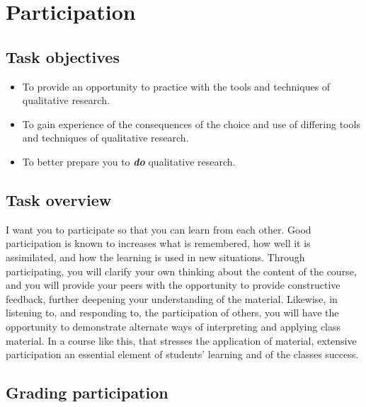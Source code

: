 \documentclass[]{book}
\theoremstyle{definition}
\theoremstyle{definition}
\theoremstyle{definition}
\theoremstyle{remark}
\begin{document}
\hypertarget{ass4}{%
\section{Participation}\label{ass4}}

\hypertarget{task-objectives-3}{%
\subsection*{Task objectives}\label{task-objectives-3}}

\begin{itemize}
\item
  To provide an opportunity to practice with the tools and techniques of
  qualitative research.
\item
  To gain experience of the consequences of the choice and use of
  differing tools and techniques of qualitative research.
\item
  To better prepare you to \textbf{\emph{do}} qualitative research.
\end{itemize}

\hypertarget{task-overview-3}{%
\subsection*{Task overview}\label{task-overview-3}}

I want you to participate so that you can learn from each other. Good
participation is known to increases what is remembered, how well it is
assimilated, and how the learning is used in new situations. Through
participating, you will clarify your own thinking about the content of
the course, and you will provide your peers with the opportunity to
provide constructive feedback, further deepening your understanding of
the material. Likewise, in listening to, and responding to, the
participation of others, you will have the opportunity to demonstrate
alternate ways of interpreting and applying class material. In a course
like this, that stresses the application of material, extensive
participation an essential element of students' learning and of the
classes success.

\hypertarget{grading-participation}{%
\subsection*{Grading participation}\label{grading-participation}}
\end{document}
